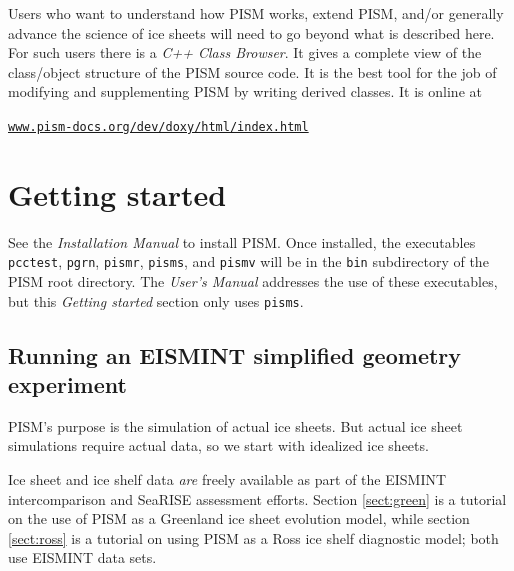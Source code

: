 \documentclass[11pt,final]{amsart}
\renewcommand{\t}[1]{\texttt{#1}}
\begin{document}
Users who want to understand how PISM works, extend PISM, and/or generally advance the science of ice sheets will need to go beyond what is described here.  For such users there is a \emph{C++ Class Browser}.  It gives a complete view of the class/object structure of the PISM source code.  It is the best tool for the job of modifying and supplementing PISM by writing derived classes.  It is online at
   \begin{center}
     \href{http://www.pism-docs.org/dev/doxy/html/index.html}{\t{www.pism-docs.org/dev/doxy/html/index.html}}
   \end{center}
  

\vspace{1.0in}
\large
\begin{center}
\normalsize
\end{center}
\normalsize


\clearpage\newpage
\section{Getting started}\label{sect:start}

See the \emph{Installation Manual} to install PISM.  Once installed, the executables \verb|pcctest|, \verb|pgrn|, \verb|pismr|, \verb|pisms|, and \verb|pismv| will be in the \verb|bin| subdirectory of the PISM root directory.  The \emph{User's Manual} addresses the use of these executables, but this \emph{Getting started} section only uses \verb|pisms|.
 
\subsection{Running an EISMINT simplified geometry experiment}  PISM's purpose is the simulation of actual ice sheets.  But actual ice sheet simulations require actual data, so we start with idealized ice sheets.

Ice sheet and ice shelf data \emph{are} freely available as part of the EISMINT intercomparison and SeaRISE assessment efforts.  Section \ref{sect:green} is a tutorial on the use of PISM as a Greenland ice sheet evolution model, while section \ref{sect:ross} is a tutorial on using PISM as a Ross ice shelf diagnostic model; both use EISMINT data sets.
\end{document}

